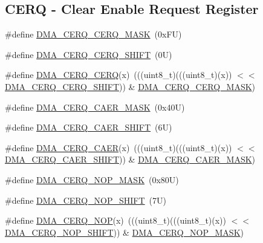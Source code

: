 \subsection*{C\+E\+RQ -\/ Clear Enable Request Register}
\begin{DoxyCompactItemize}
\item 
\#define \mbox{\hyperlink{group___d_m_a___register___masks_ga6c4e980f82778e0191670788d29dcb9e}{D\+M\+A\+\_\+\+C\+E\+R\+Q\+\_\+\+C\+E\+R\+Q\+\_\+\+M\+A\+SK}}~(0x\+F\+U)
\item 
\#define \mbox{\hyperlink{group___d_m_a___register___masks_gaca402b011bea1924acca0e1e708c6db6}{D\+M\+A\+\_\+\+C\+E\+R\+Q\+\_\+\+C\+E\+R\+Q\+\_\+\+S\+H\+I\+FT}}~(0\+U)
\item 
\#define \mbox{\hyperlink{group___d_m_a___register___masks_ga06bccf8bb52efa7918d7ba7648d30aa0}{D\+M\+A\+\_\+\+C\+E\+R\+Q\+\_\+\+C\+E\+RQ}}(x)~(((uint8\+\_\+t)(((uint8\+\_\+t)(x)) $<$$<$ \mbox{\hyperlink{group___d_m_a___register___masks_gaca402b011bea1924acca0e1e708c6db6}{D\+M\+A\+\_\+\+C\+E\+R\+Q\+\_\+\+C\+E\+R\+Q\+\_\+\+S\+H\+I\+FT}})) \& \mbox{\hyperlink{group___d_m_a___register___masks_ga6c4e980f82778e0191670788d29dcb9e}{D\+M\+A\+\_\+\+C\+E\+R\+Q\+\_\+\+C\+E\+R\+Q\+\_\+\+M\+A\+SK}})
\item 
\#define \mbox{\hyperlink{group___d_m_a___register___masks_ga17f24999dd91f4ddc8f10ec2927da85b}{D\+M\+A\+\_\+\+C\+E\+R\+Q\+\_\+\+C\+A\+E\+R\+\_\+\+M\+A\+SK}}~(0x40\+U)
\item 
\#define \mbox{\hyperlink{group___d_m_a___register___masks_ga8a6482d87d17b4fec19e2fd984323f54}{D\+M\+A\+\_\+\+C\+E\+R\+Q\+\_\+\+C\+A\+E\+R\+\_\+\+S\+H\+I\+FT}}~(6\+U)
\item 
\#define \mbox{\hyperlink{group___d_m_a___register___masks_gada20fa2dafc6c7a33ce0fc216390d2ce}{D\+M\+A\+\_\+\+C\+E\+R\+Q\+\_\+\+C\+A\+ER}}(x)~(((uint8\+\_\+t)(((uint8\+\_\+t)(x)) $<$$<$ \mbox{\hyperlink{group___d_m_a___register___masks_ga8a6482d87d17b4fec19e2fd984323f54}{D\+M\+A\+\_\+\+C\+E\+R\+Q\+\_\+\+C\+A\+E\+R\+\_\+\+S\+H\+I\+FT}})) \& \mbox{\hyperlink{group___d_m_a___register___masks_ga17f24999dd91f4ddc8f10ec2927da85b}{D\+M\+A\+\_\+\+C\+E\+R\+Q\+\_\+\+C\+A\+E\+R\+\_\+\+M\+A\+SK}})
\item 
\#define \mbox{\hyperlink{group___d_m_a___register___masks_gae8c0c81a0c9cfc2e2bd4aaa42ee5b204}{D\+M\+A\+\_\+\+C\+E\+R\+Q\+\_\+\+N\+O\+P\+\_\+\+M\+A\+SK}}~(0x80\+U)
\item 
\#define \mbox{\hyperlink{group___d_m_a___register___masks_ga68bc3b3f8e1fe22186c0e92e73a93c64}{D\+M\+A\+\_\+\+C\+E\+R\+Q\+\_\+\+N\+O\+P\+\_\+\+S\+H\+I\+FT}}~(7\+U)
\item 
\#define \mbox{\hyperlink{group___d_m_a___register___masks_ga4c17adac0a84734a877eef48f53c204f}{D\+M\+A\+\_\+\+C\+E\+R\+Q\+\_\+\+N\+OP}}(x)~(((uint8\+\_\+t)(((uint8\+\_\+t)(x)) $<$$<$ \mbox{\hyperlink{group___d_m_a___register___masks_ga68bc3b3f8e1fe22186c0e92e73a93c64}{D\+M\+A\+\_\+\+C\+E\+R\+Q\+\_\+\+N\+O\+P\+\_\+\+S\+H\+I\+FT}})) \& \mbox{\hyperlink{group___d_m_a___register___masks_gae8c0c81a0c9cfc2e2bd4aaa42ee5b204}{D\+M\+A\+\_\+\+C\+E\+R\+Q\+\_\+\+N\+O\+P\+\_\+\+M\+A\+SK}})
\end{DoxyCompactItemize}
